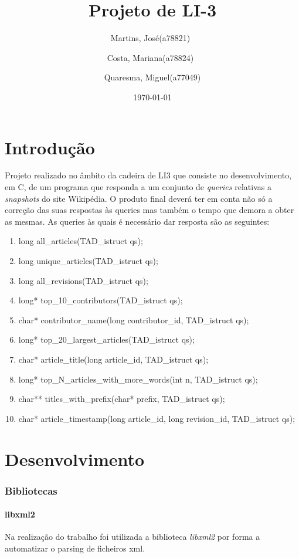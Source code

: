 \documentclass{report}
\title{Projeto de LI-3}
\author{Martins, José(a78821)\
        \and 
        Costa, Mariana(a78824)\
        \and 
        Quaresma, Miguel(a77049)
        }
\date{\today}                   %
\begin{document}
\begin{titlepage}
\maketitle
\end{titlepage}

\tableofcontents

\part{Introdução}
\justify
Projeto realizado no âmbito da cadeira de LI3 que consiste no desenvolvimento, em C, de um programa que responda a um conjunto de \textit{queries} relativas a \textit{snapshots} do site Wikipédia. O produto final deverá ter em conta não só a correção das suas respostas às queries mas também o tempo que demora a obter as mesmas.
As queries às quais é necessário dar resposta são as seguintes:
\begin{enumerate}
    \item long all\_articles(TAD\_istruct qs);
    \item long unique\_articles(TAD\_istruct qs);
    \item long all\_revisions(TAD\_istruct qs);
    \item long* top\_10\_contributors(TAD\_istruct qs);
    \item char* contributor\_name(long contributor\_id, TAD\_istruct qs);
    \item long* top\_20\_largest\_articles(TAD\_istruct qs);
    \item char* article\_title(long article\_id, TAD\_istruct qs);
    \item long* top\_N\_articles\_with\_more\_words(int n, TAD\_istruct qs);
    \item char** titles\_with\_prefix(char* prefix, TAD\_istruct qs);
    \item char* article\_timestamp(long article\_id, long revision\_id, TAD\_istruct qs);
\end{enumerate}


\part{Desenvolvimento}
\section{Bibliotecas}

\subsection{libxml2}
Na realização do trabalho foi utilizada a biblioteca \emph{libxml2} por forma a automatizar o parsing de ficheiros xml.
\end{document}
